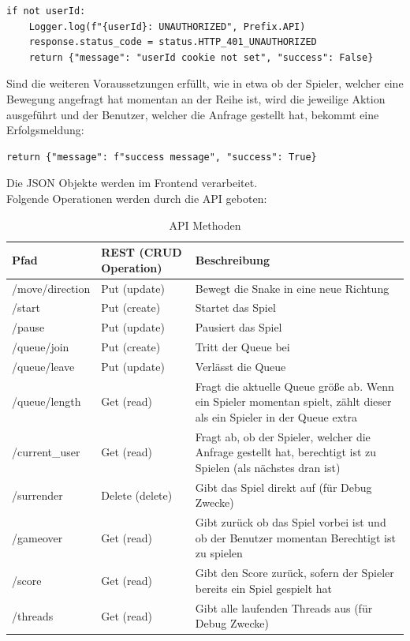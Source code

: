 \documentclass[a4paper,12pt]{scrartcl}
\begin{document}
\begin{lstlisting}
if not userId:
	Logger.log(f"{userId}: UNAUTHORIZED", Prefix.API)
	response.status_code = status.HTTP_401_UNAUTHORIZED
	return {"message": "userId cookie not set", "success": False}
\end{lstlisting}

Sind die weiteren Voraussetzungen erfüllt, wie in etwa ob der Spieler, welcher eine Bewegung angefragt hat momentan an der Reihe ist, wird die jeweilige Aktion ausgeführt und der Benutzer, welcher die Anfrage gestellt hat, bekommt eine Erfolgsmeldung:

\begin{lstlisting}
return {"message": f"success message", "success": True}
\end{lstlisting}

Die JSON Objekte werden im Frontend verarbeitet.\\
Folgende Operationen werden durch die API geboten:


\newpage

\begin{table}
\centering
\begin{tabular}[!htb]{p{4cm}|p{4cm}|p{8cm}}
Pfad & REST (CRUD Operation) & Beschreibung \\
\hline
/move/{direction} & Put (update) & Bewegt die Snake in eine neue Richtung \\
/start & Put (create) & Startet das Spiel \\
/pause & Put (update) & Pausiert das Spiel \\
/queue/join & Put (create) & Tritt der Queue bei \\
/queue/leave & Put (update) & Verlässt die Queue \\
/queue/length & Get (read) & Fragt die aktuelle Queue größe ab. Wenn ein Spieler momentan spielt, zählt dieser als ein Spieler in der Queue extra \\
/current\_user & Get (read) & Fragt ab, ob der Spieler, welcher die Anfrage gestellt hat, berechtigt ist zu Spielen (als nächstes dran ist) \\
/surrender & Delete (delete) & Gibt das Spiel direkt auf (für Debug Zwecke) \\
/gameover & Get (read) & Gibt zurück ob das Spiel vorbei ist und ob der Benutzer momentan Berechtigt ist zu spielen \\
/score & Get (read) & Gibt den Score zurück, sofern der Spieler bereits ein Spiel gespielt hat \\
/threads & Get (read) & Gibt alle laufenden Threads aus (für Debug Zwecke)
\end{tabular}
\caption{API Methoden}
\end{table}
\end{document}
